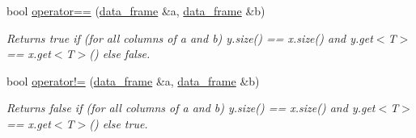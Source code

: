 \begin{DoxyCompactItemize}
bool \hyperlink{namespaceboost_1_1numeric_1_1ublas_ae71af2d81b7a1117420b6a3823e821a1}{operator==} (\hyperlink{classboost_1_1numeric_1_1ublas_1_1data__frame}{data\+\_\+frame} \&a, \hyperlink{classboost_1_1numeric_1_1ublas_1_1data__frame}{data\+\_\+frame} \&b)
\begin{DoxyCompactList}\small\item\em Returns {\ttfamily true} if (for all columns of a and b) {\ttfamily y.\+size()} == {\ttfamily x.\+size()} and {\ttfamily y.\+get$<$\+T$>$} == {\ttfamily x.\+get$<$\+T$>$()} else {\ttfamily false}. \end{DoxyCompactList}\item 
bool \hyperlink{namespaceboost_1_1numeric_1_1ublas_a1f64fd7d8ef5ad76620006b498fe8400}{operator!=} (\hyperlink{classboost_1_1numeric_1_1ublas_1_1data__frame}{data\+\_\+frame} \&a, \hyperlink{classboost_1_1numeric_1_1ublas_1_1data__frame}{data\+\_\+frame} \&b)
\begin{DoxyCompactList}\small\item\em Returns {\ttfamily false} if (for all columns of a and b) {\ttfamily y.\+size()} == {\ttfamily x.\+size()} and {\ttfamily y.\+get$<$\+T$>$} == {\ttfamily x.\+get$<$\+T$>$()} else {\ttfamily true}. \end{DoxyCompactList}\end{DoxyCompactItemize}
